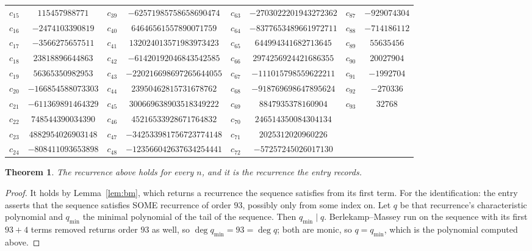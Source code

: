 \documentclass[11pt,a4paper]{article}
\theoremstyle{plain}
\newtheorem{theorem}{Theorem}
\theoremstyle{definition}
\begin{document}
\begin{center}
\begin{tabular}{cccccccc}
$c_{15}$ & $115457988771$ & $c_{39}$ & $-62571985758658690474$ & $c_{63}$ & $-2703022201943272362$ & $c_{87}$ & $-929074304$ \\
$c_{16}$ & $-2474103390819$ & $c_{40}$ & $64646561557890071759$ & $c_{64}$ & $-8377653489661972711$ & $c_{88}$ & $-714186112$ \\
$c_{17}$ & $-3566275657511$ & $c_{41}$ & $132024013571983973423$ & $c_{65}$ & $644994341682713645$ & $c_{89}$ & $55635456$ \\
$c_{18}$ & $23818896644863$ & $c_{42}$ & $-61420192046843542585$ & $c_{66}$ & $2974256924421686355$ & $c_{90}$ & $20027904$ \\
$c_{19}$ & $56365350982953$ & $c_{43}$ & $-220216698697265644055$ & $c_{67}$ & $-111015798559622211$ & $c_{91}$ & $-1992704$ \\
$c_{20}$ & $-166854588073303$ & $c_{44}$ & $23950462815731678762$ & $c_{68}$ & $-918769698647895624$ & $c_{92}$ & $-270336$ \\
$c_{21}$ & $-611369891464329$ & $c_{45}$ & $300669638903518349222$ & $c_{69}$ & $8847935378160904$ & $c_{93}$ & $32768$ \\
$c_{22}$ & $748544390034390$ & $c_{46}$ & $45216533928671764832$ & $c_{70}$ & $246514350084304134$ &  &  \\
$c_{23}$ & $4882954026903148$ & $c_{47}$ & $-342533981756723774148$ & $c_{71}$ & $2025312020960226$ &  &  \\
$c_{24}$ & $-808411093653898$ & $c_{48}$ & $-123566042637634254441$ & $c_{72}$ & $-57257245026017130$ &  &  \\
\end{tabular}
\end{center}

\begin{theorem}
The recurrence above holds for every $n$, and it is the recurrence the entry records.
\end{theorem}

\begin{proof}
It holds by Lemma~\ref{lem:bm}, which returns a recurrence the sequence satisfies from its
first term. For the identification: the entry asserts that the sequence satisfies SOME
recurrence of order $93$, possibly only from some index on. Let $q$ be that recurrence's
characteristic polynomial and $q_{\min}$ the minimal polynomial of the tail of the sequence.
Then $q_{\min}\mid q$. Berlekamp--Massey run on the sequence with its first $93+4$ terms
removed returns order $93$ as well, so $\deg q_{\min}=93=\deg q$; both are monic, so
$q=q_{\min}$, which is the polynomial computed above.
\end{proof}
\end{document}
